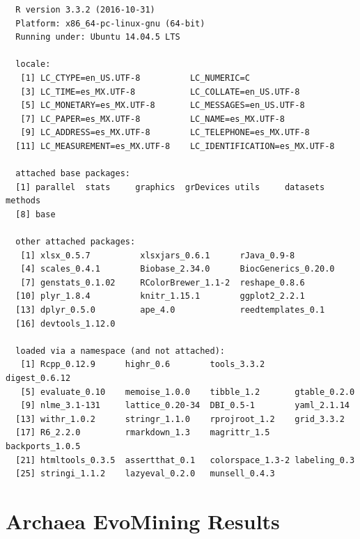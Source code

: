 \documentclass[12pt,twoside]{reedthesis}
\begin{document}
  \begin{verbatim}
  R version 3.3.2 (2016-10-31)
  Platform: x86_64-pc-linux-gnu (64-bit)
  Running under: Ubuntu 14.04.5 LTS
  
  locale:
   [1] LC_CTYPE=en_US.UTF-8          LC_NUMERIC=C                 
   [3] LC_TIME=es_MX.UTF-8           LC_COLLATE=en_US.UTF-8       
   [5] LC_MONETARY=es_MX.UTF-8       LC_MESSAGES=en_US.UTF-8      
   [7] LC_PAPER=es_MX.UTF-8          LC_NAME=es_MX.UTF-8          
   [9] LC_ADDRESS=es_MX.UTF-8        LC_TELEPHONE=es_MX.UTF-8     
  [11] LC_MEASUREMENT=es_MX.UTF-8    LC_IDENTIFICATION=es_MX.UTF-8
  
  attached base packages:
  [1] parallel  stats     graphics  grDevices utils     datasets  methods  
  [8] base     
  
  other attached packages:
   [1] xlsx_0.5.7          xlsxjars_0.6.1      rJava_0.9-8        
   [4] scales_0.4.1        Biobase_2.34.0      BiocGenerics_0.20.0
   [7] genstats_0.1.02     RColorBrewer_1.1-2  reshape_0.8.6      
  [10] plyr_1.8.4          knitr_1.15.1        ggplot2_2.2.1      
  [13] dplyr_0.5.0         ape_4.0             reedtemplates_0.1  
  [16] devtools_1.12.0    
  
  loaded via a namespace (and not attached):
   [1] Rcpp_0.12.9      highr_0.6        tools_3.3.2      digest_0.6.12   
   [5] evaluate_0.10    memoise_1.0.0    tibble_1.2       gtable_0.2.0    
   [9] nlme_3.1-131     lattice_0.20-34  DBI_0.5-1        yaml_2.1.14     
  [13] withr_1.0.2      stringr_1.1.0    rprojroot_1.2    grid_3.3.2      
  [17] R6_2.2.0         rmarkdown_1.3    magrittr_1.5     backports_1.0.5 
  [21] htmltools_0.3.5  assertthat_0.1   colorspace_1.3-2 labeling_0.3    
  [25] stringi_1.1.2    lazyeval_0.2.0   munsell_0.4.3   
  \end{verbatim}
  
  \hypertarget{refux5flabels}{\chapter{Archaea EvoMining
  Results}\label{refux5flabels}}
  
\end{document}
